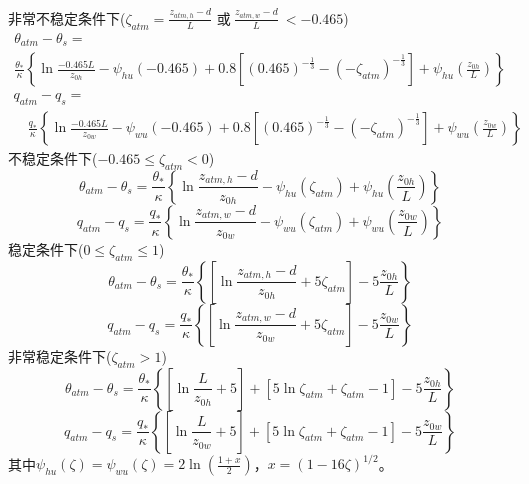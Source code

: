 \noindent 非常不稳定条件下($\zeta_{atm}=\frac{z_{atm,h}-d}{L}$ 或$ \ \frac{z_{atm,w}-d}{L}\ <-0.465$)
\begin{equation}\label{theta_VU}
\begin{array}{l}\theta_{atm}-\theta_{s}= \\ 
     \frac{\theta_{*}}{\kappa}\left\{\ln \frac{-0.465 L}{z_{0 h}}-\psi_{hu}(-0.465)+0.8\left[(0.465)^{-\frac{1}{3}}-\left(-\zeta_{atm}\right)^{-\frac{1}{3}}\right]
     +\psi_{hu}\left(\frac{z_{0 h}}{L}\right)\right\}\end{array}
\end{equation}
\begin{equation}\label{q_VU}
\begin{array}{l}q_{atm}-q_{s}= \\ 
     \quad \frac{q_{*}}{\kappa}\left\{\ln \frac{-0.465 L}{z_{0 w}}-\psi_{wu}(-0.465)+0.8\left[(0.465)^{-\frac{1}{3}}-
     \left(-\zeta_{atm}\right)^{-\frac{1}{3}}\right]+\psi_{wu}\left(\frac{z_{0 w}}{L}\right)\right\}\end{array}
\end{equation}
不稳定条件下($-0.465\le\zeta_{atm}<0$)
\begin{equation}
\theta_{atm}-\theta_{s}=\frac{\theta_{*}}{\kappa}\left\{\ln \frac{z_{atm, h}-d}{z_{0 h}}-\psi_{hu}
\left(\zeta_{atm}\right)+\psi_{hu}\left(\frac{z_{0 h}}{L}\right)\right\}
\end{equation}
\begin{equation}
q_{atm}-q_{s}=\frac{q_{*}}{\kappa}\left\{\ln \frac{z_{atm, w}-d}{z_{0 w}}-
\psi_{wu}\left(\zeta_{atm}\right)+\psi_{wu}\left(\frac{z_{0 w}}{L}\right)\right\}
\end{equation}
稳定条件下($0\le\zeta_{atm}\le1$)
\begin{equation}
\theta_{atm}-\theta_{s}=\frac{\theta_{*}}{\kappa}\left\{\left[\ln \frac{z_{atm, h}-d}{z_{0 h}}+5 \zeta_{atm}\right]-5 \frac{z_{0 h}}{L}\right\}
\end{equation}
\begin{equation}
q_{atm}-q_{s}=\frac{q_{*}}{\kappa}\left\{\left[\ln \frac{z_{atm, w}-d}{z_{0 w}}+5 \zeta_{atm}\right]-5 \frac{z_{0 w}}{L}\right\}
\end{equation}
非常稳定条件下($\zeta_{atm}>1$)
\begin{equation}\label{theta_VS}
\theta_{atm}-\theta_{s}=\frac{\theta_{*}}{\kappa}\left\{\left[\ln \frac{L}{z_{0 h}}+5\right]
+\left[5 \ln \zeta_{atm}+\zeta_{atm}-1\right]-5 \frac{z_{0 h}}{L}\right\}
\end{equation}
\begin{equation}\label{q_VS}
q_{atm}-q_{s}=\frac{q_{*}}{\kappa}\left\{\left[\ln \frac{L}{z_{0 w}}+5\right]
+\left[5 \ln \zeta_{atm}+\zeta_{atm}-1\right]-5 \frac{z_{0 w}}{L}\right\}
\end{equation}
其中$\psi_{hu}\left(\zeta\right)=\psi_{wu}\left(\zeta\right)=2\ln{\left(\frac{1+x}{2}\right)}$，$x={(1-16\zeta)}^{1/2}$。

